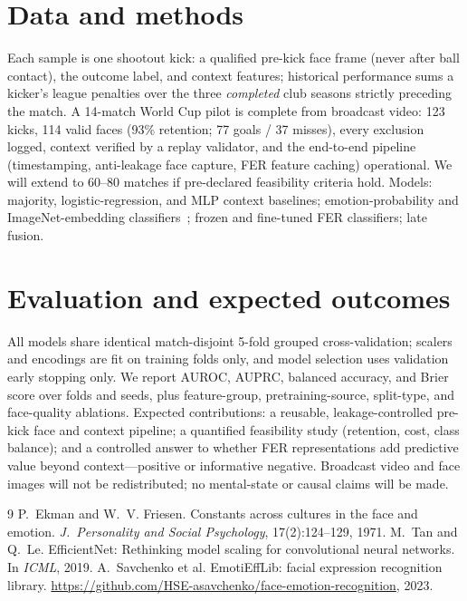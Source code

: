\documentclass{article}
\begin{document}
\section{Data and methods}
Each sample is one shootout kick: a qualified pre-kick face frame (never after ball contact), the outcome label, and context features; historical performance sums a kicker's league penalties over the three \emph{completed} club seasons strictly preceding the match. A 14-match World Cup pilot is complete from broadcast video: 123 kicks, 114 valid faces (93\% retention; 77 goals / 37 misses), every exclusion logged, context verified by a replay validator, and the end-to-end pipeline (timestamping, anti-leakage face capture, FER feature caching) operational. We will extend to 60--80 matches if pre-declared feasibility criteria hold. Models: majority, logistic-regression, and MLP context baselines; emotion-probability and ImageNet-embedding classifiers~\citep{effnet}; frozen and fine-tuned FER classifiers; late fusion.

\section{Evaluation and expected outcomes}
All models share identical match-disjoint 5-fold grouped cross-validation; scalers and encodings are fit on training folds only, and model selection uses validation early stopping only. We report AUROC, AUPRC, balanced accuracy, and Brier score over folds and seeds, plus feature-group, pretraining-source, split-type, and face-quality ablations. Expected contributions: a reusable, leakage-controlled pre-kick face and context pipeline; a quantified feasibility study (retention, cost, class balance); and a controlled answer to whether FER representations add predictive value beyond context---positive or informative negative. Broadcast video and face images will not be redistributed; no mental-state or causal claims will be made.

\begin{thebibliography}{9}\footnotesize
{} P.~Ekman and W.~V. Friesen. Constants across cultures in the face and emotion. \emph{J.~Personality and Social Psychology}, 17(2):124--129, 1971.
 M.~Tan and Q.~Le. EfficientNet: Rethinking model scaling for convolutional neural networks. In \emph{ICML}, 2019.
 A.~Savchenko et al. EmotiEffLib: facial expression recognition library. \url{https://github.com/HSE-asavchenko/face-emotion-recognition}, 2023.
\end{thebibliography}
\end{document}
